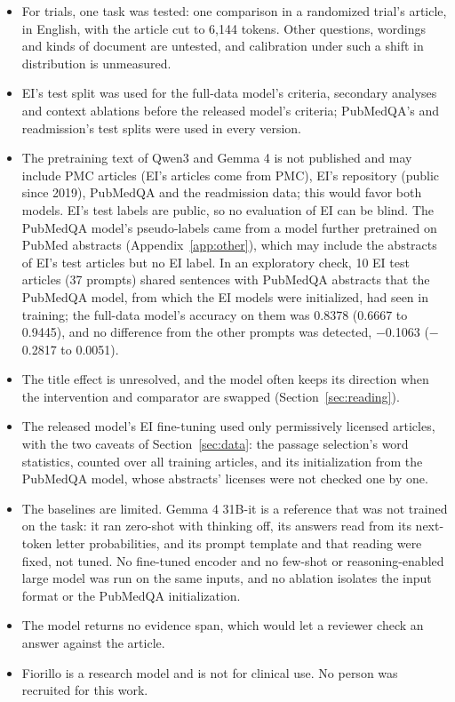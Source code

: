 \documentclass[11pt,letterpaper]{article}
\begin{document}
\begin{itemize}\setlength{\itemsep}{1pt}
\item For trials, one task was tested: one comparison in a randomized trial's article, in English, with the article cut to 6,144 tokens. Other questions, wordings and kinds of document are untested, and calibration under such a shift in distribution is unmeasured.
\item EI's test split was used for the full-data model's criteria, secondary analyses and context ablations before the released model's criteria; PubMedQA's and readmission's test splits were used in every version.
\item The pretraining text of Qwen3 and Gemma 4 is not published and may include PMC articles (EI's articles come from PMC), EI's repository (public since 2019), PubMedQA and the readmission data; this would favor both models. EI's test labels are public, so no evaluation of EI can be blind. The PubMedQA model's pseudo-labels came from a model further pretrained on PubMed abstracts (Appendix~\ref{app:other}), which may include the abstracts of EI's test articles but no EI label. In an exploratory check, 10 EI test articles (37 prompts) shared sentences with PubMedQA abstracts that the PubMedQA model, from which the EI models were initialized, had seen in training; the full-data model's accuracy on them was 0.8378 (0.6667 to 0.9445), and no difference from the other prompts was detected, $-$0.1063 ($-$0.2817 to 0.0051).
\item The title effect is unresolved, and the model often keeps its direction when the intervention and comparator are swapped (Section~\ref{sec:reading}).
\item The released model's EI fine-tuning used only permissively licensed articles, with the two caveats of Section~\ref{sec:data}: the passage selection's word statistics, counted over all training articles, and its initialization from the PubMedQA model, whose abstracts' licenses were not checked one by one.
\item The baselines are limited. Gemma 4 31B-it is a reference that was not trained on the task: it ran zero-shot with thinking off, its answers read from its next-token letter probabilities, and its prompt template and that reading were fixed, not tuned. No fine-tuned encoder and no few-shot or reasoning-enabled large model was run on the same inputs, and no ablation isolates the input format or the PubMedQA initialization.
\item The model returns no evidence span, which would let a reviewer check an answer against the article.
\item Fiorillo is a research model and is not for clinical use. No person was recruited for this work.
\end{itemize}
\end{document}
